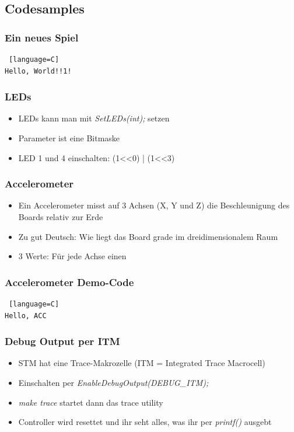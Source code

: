 \documentclass[ngerman,compress]{beamer}
\begin{document}
\subsection{Codesamples}

\begin{frame}[fragile]
	\frametitle{Ein neues Spiel}
	\begin{lstlisting} [language=C]
Hello, World!!1!
	\end{lstlisting}
\end{frame}

\begin{frame}
	\frametitle{LEDs}
	\begin{itemize}
		\item LEDs kann man mit \emph{SetLEDs(int);} setzen
		\item Parameter ist eine Bitmaske
		\item LED 1 und 4 einschalten: (1<<0) | (1<<3)
	\end{itemize}
\end{frame}

\begin{frame}
	\frametitle{Accelerometer}
	\begin{itemize}
		\item Ein Accelerometer misst auf 3 Achsen (X, Y und Z) die Beschleunigung des Boards relativ zur Erde
		\item Zu gut Deutsch: Wie liegt das Board grade im dreidimensionalem Raum
		\item 3 Werte: Für jede Achse einen
	\end{itemize}
\end{frame}

\begin{frame} [fragile]
	\frametitle{Accelerometer Demo-Code}
	\begin{lstlisting} [language=C]
Hello, ACC
	\end{lstlisting}
\end{frame}

\begin{frame}
	\frametitle{Debug Output per ITM}
	\begin{itemize}
		\item STM hat eine Trace-Makrozelle (ITM = Integrated Trace Macrocell)
		\item Einschalten per \emph{EnableDebugOutput(DEBUG\_ITM);}
		\item \emph{make trace} startet dann das trace utility
		\item Controller wird resettet und ihr seht alles, was ihr per \emph{printf()} ausgebt
	\end{itemize}
\end{frame}
\end{document}
